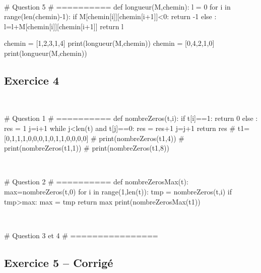 \documentclass[10pt,fleqn]{article} %
\begin{document}
\begin{multicols}{2}
\begin{corrige}
$\quad$
\begin{python}
# Question 5
# ==========
def longueur(M,chemin):
    l = 0
    for i in range(len(chemin)-1):
        if M[chemin[i]][chemin[i+1]]<0:
            return -1
        else :
            l=l+M[chemin[i]][chemin[i+1]]
    return l
    
chemin = [1,2,3,1,4]
print(longueur(M,chemin))        
chemin = [0,4,2,1,0]
print(longueur(M,chemin))
\end{python}
\end{corrige}

\vfill

\columnbreak

\subsection*{Exercice 4}
\begin{corrige}
$\quad$
\begin{python}
# Question 1 
# ==========
def nombreZeros(t,i):
    if t[i]==1:
        return 0
    else : 
        res = 1
        j=i+1
        while j<len(t) and t[j]==0:
            res = res+1
            j=j+1
    return res
# t1=[0,1,1,1,0,0,0,1,0,1,1,0,0,0,0]
# print(nombreZeros(t1,4))
# print(nombreZeros(t1,1))
# print(nombreZeros(t1,8))
\end{python}
\end{corrige}

\begin{corrige}
$\quad$
\begin{python}
# Question 2
# ==========
def nombreZerosMax(t):
    max=nombreZeros(t,0)
    for i in range(1,len(t)):
        tmp = nombreZeros(t,i)
        if tmp>max:
            max = tmp
    return max
print(nombreZerosMax(t1))
\end{python}
\end{corrige}

\begin{corrige}
$\quad$
\begin{python}
# Question 3 et 4
# ================
\end{python}
\end{corrige}
\newpage

\subsection*{Exercice 5 -- Corrigé}


\end{multicols}
\end{document}
